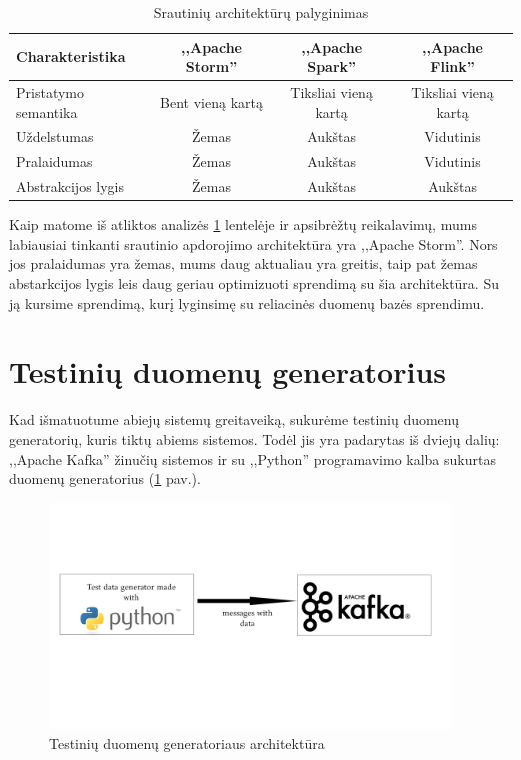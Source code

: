 \documentclass{VUMIFPSkursinis}
\begin{document}
\begin{center}
    \begin{table}[!htbp]
        \caption{Srautinių architektūrų palyginimas}
        \label{table:comparer}
        \begin{tabular}{ | l | c | c | c | } 
            \hline
            Charakteristika & ,,Apache Storm'' & ,,Apache Spark'' & ,,Apache Flink'' \\* \hline
            Pristatymo semantika & Bent vieną kartą & Tiksliai vieną kartą & Tiksliai vieną kartą \\* \hline
            Uždelstumas & Žemas & Aukštas & Vidutinis \\* \hline
            Pralaidumas & Žemas & Aukštas & Vidutinis \\* \hline
            Abstrakcijos lygis & Žemas & Aukštas & Aukštas \\* \hline
        \end{tabular}
    \end{table}
\end{center}\par

Kaip matome iš atliktos analizės \ref{table:comparer} lentelėje ir apsibrėžtų reikalavimų, mums labiausiai tinkanti srautinio apdorojimo architektūra yra ,,Apache Storm''. 
Nors jos pralaidumas yra žemas, mums daug aktualiau yra greitis, taip pat žemas abstarkcijos lygis leis daug geriau optimizuoti sprendimą su šia architektūra. Su ją kursime
sprendimą, kurį lyginsimę su reliacinės duomenų bazės sprendimu.

\section{Testinių duomenų generatorius}

Kad išmatuotume abiejų sistemų greitaveiką, sukurėme testinių duomenų generatorių, kuris tiktų abiems sistemos. Todėl jis yra padarytas iš dviejų dalių:
,,Apache Kafka'' žinučių sistemos ir su ,,Python'' programavimo kalba sukurtas duomenų generatorius (\ref{fig:generator} pav.).

\begin{figure}[!htbp]
    \centering
    \includegraphics[width=0.95\textwidth]{img/testdatagenerator.jpg}
    \caption{Testinių duomenų generatoriaus architektūra}
    \label{fig:generator}
\end{figure}
\end{document}

